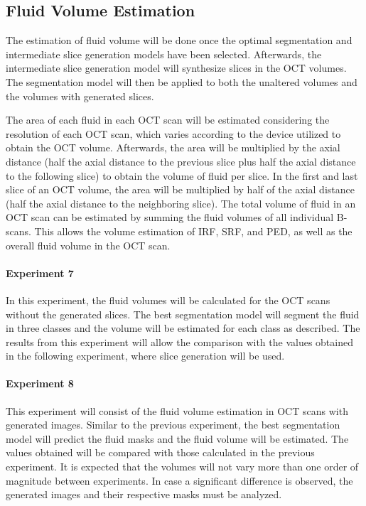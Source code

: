 \subsection{Fluid Volume Estimation}
The estimation of fluid volume will be done once the optimal segmentation and intermediate slice generation models have been selected. Afterwards, the intermediate slice generation model will synthesize slices in the OCT volumes. The segmentation model will then be applied to both the unaltered volumes and the volumes with generated slices. 
\par
The area of each fluid in each OCT scan will be estimated considering the resolution of each OCT scan, which varies according to the device utilized to obtain the OCT volume. Afterwards, the area will be multiplied by the axial distance (half the axial distance to the previous slice plus half the axial distance to the following slice) to obtain the volume of fluid per slice. In the first and last slice of an OCT volume, the area will be multiplied by half of the axial distance (half the axial distance to the neighboring slice). The total volume of fluid in an OCT scan can be estimated by summing the fluid volumes of all individual B-scans. This allows the volume estimation of IRF, SRF, and PED, as well as the overall fluid volume in the OCT scan.

\paragraph{Experiment 7}
In this experiment, the fluid volumes will be calculated for the OCT scans without the generated slices. The best segmentation model will segment the fluid in three classes and the volume will be estimated for each class as described. The results from this experiment will allow the comparison with the values obtained in the following experiment, where slice generation will be used.

\paragraph{Experiment 8}
This experiment will consist of the fluid volume estimation in OCT scans with generated images. Similar to the previous experiment, the best segmentation model will predict the fluid masks and the fluid volume will be estimated. The values obtained will be compared with those calculated in the previous experiment. It is expected that the volumes will not vary more than one order of magnitude between experiments. In case a significant difference is observed, the generated images and their respective masks must be analyzed.